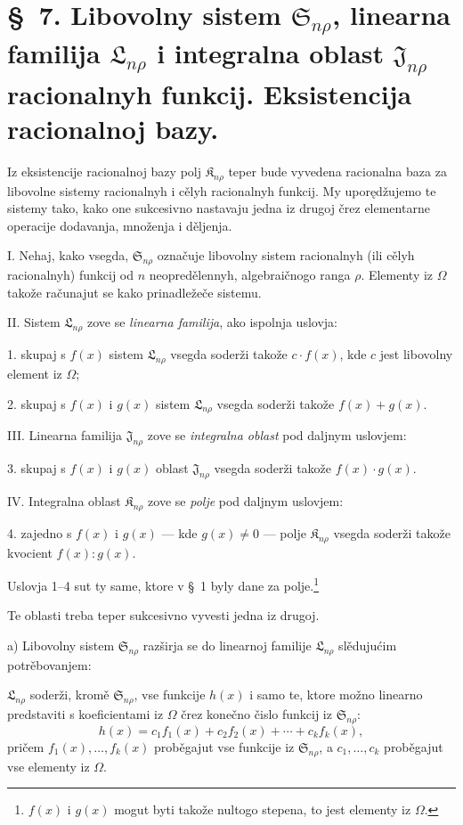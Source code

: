 \documentclass[11pt]{article}
\providecommand{\Kfield}{\mathfrak{K}}
\providecommand{\Ssys}{\mathfrak{S}}
\providecommand{\Jdom}{\mathfrak{J}}
\providecommand{\Lsys}{\mathfrak{L}}
\begin{document}
\section*{\S\ 7. Libovolny sistem $\Ssys_{n\rho}$, linearna familija $\Lsys_{n\rho}$ i integralna oblast $\Jdom_{n\rho}$ racionalnyh funkcij. Eksistencija racionalnoj bazy.}

Iz eksistencije racionalnoj bazy polj $\Kfield_{n\rho}$ teper bude vyvedena racionalna baza za libovolne sistemy racionalnyh i cělyh racionalnyh funkcij. My uporędžujemo te sistemy tako, kako one sukcesivno nastavaju jedna iz drugoj črez elementarne operacije dodavanja, množenja i děljenja.

I. Nehaj, kako vsegda, $\Ssys_{n\rho}$ označuje libovolny sistem racionalnyh (ili cělyh racionalnyh) funkcij od $n$ neopredělennyh, algebraičnogo ranga $\rho$. Elementy iz $\Omega$ takože računajut se kako prinadležeče sistemu.

II. Sistem $\Lsys_{n\rho}$ zove se {\itshape linearna familija}, ako ispolnja uslovja:

1. skupaj s $f(x)$ sistem $\Lsys_{n\rho}$ vsegda soderži takože $c\cdot f(x)$, kde $c$ jest libovolny element iz $\Omega$;

2. skupaj s $f(x)$ i $g(x)$ sistem $\Lsys_{n\rho}$ vsegda soderži takože $f(x)+g(x)$.

III. Linearna familija $\Jdom_{n\rho}$ zove se {\itshape integralna oblast} pod daljnym uslovjem:

3. skupaj s $f(x)$ i $g(x)$ oblast $\Jdom_{n\rho}$ vsegda soderži takože $f(x)\cdot g(x)$.

IV. Integralna oblast $\Kfield_{n\rho}$ zove se {\itshape polje} pod daljnym uslovjem:

4. zajedno s $f(x)$ i $g(x)$ --- kde $g(x)\ne0$ --- polje $\Kfield_{n\rho}$ vsegda soderži takože kvocient $f(x):g(x)$.

Uslovja 1--4 sut ty same, ktore v \S\ 1 byly dane za polje.\footnote{$f(x)$ i $g(x)$ mogut byti takože nultogo stepena, to jest elementy iz $\Omega$.}

Te oblasti treba teper sukcesivno vyvesti jedna iz drugoj.

a) Libovolny sistem $\Ssys_{n\rho}$ razširja se do linearnoj familije $\Lsys_{n\rho}$ slědujućim potrěbovanjem:

$\Lsys_{n\rho}$ soderži, kromě $\Ssys_{n\rho}$, vse funkcije $h(x)$ i samo te, ktore možno linearno predstaviti s koeficientami iz $\Omega$ črez konečno čislo funkcij iz $\Ssys_{n\rho}$:
\[
  h(x)=c_1f_1(x)+c_2f_2(x)+\cdots+c_kf_k(x),
\]
pričem $f_1(x),\ldots,f_k(x)$ proběgajut vse funkcije iz $\Ssys_{n\rho}$, a $c_1,\ldots,c_k$ proběgajut vse elementy iz $\Omega$.
\end{document}
